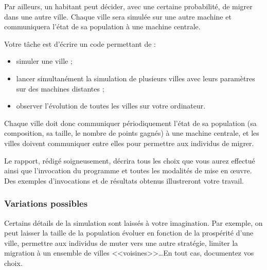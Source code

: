 \documentclass[11pt]{article}
\begin{document}
Par ailleurs, un habitant peut décider, avec une certaine
probabilité, de migrer dans une autre ville. Chaque ville
sera simulée sur une autre machine et communiquera l'état
de sa population à une machine centrale.

\medskip

Votre tâche est d'écrire un code permettant de :
\begin{itemize}
\item simuler une ville ;
\item lancer simultanément la simulation de plusieurs villes avec leurs paramètres
   sur des machines distantes ;
\item observer l'évolution de toutes les villes sur votre ordinateur.
\end{itemize}

Chaque ville doit donc communiquer périodiquement l'état de sa population
(sa composition, sa taille, le nombre de points gagnés)
à une machine centrale, et les villes doivent communiquer entre elles pour
permettre aux individus de migrer.

Le rapport, rédigé soigneusement, décrira tous les choix que vous aurez effectué ainsi que l'invocation du programme et toutes les modalités de mise en œuvre.
Des exemples d'invocations et de résultats obtenus illustreront votre travail.

\subsubsection*{Variations possibles}

Certains détails de la simulation sont laissés à votre imagination.
Par exemple, on peut laisser la taille de la population évoluer en
fonction de la prospérité d'une ville, permettre aux individus de
muter vers une autre stratégie, limiter la migration à un ensemble
de villes <<voisines>>\ldots En tout cas, documentez vos choix.
\end{document}
